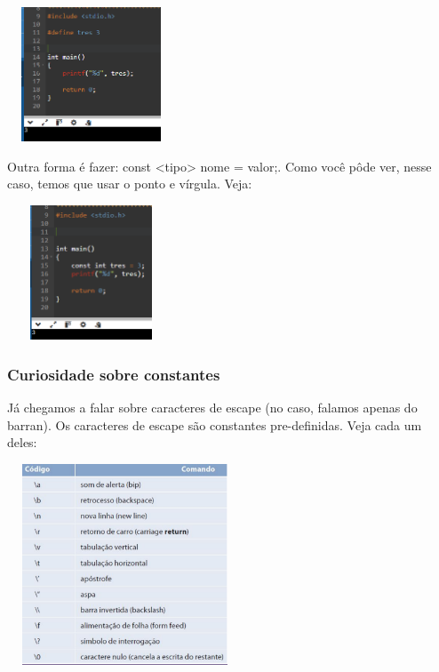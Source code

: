 \documentclass{report}
\begin{document}
	\begin{center}
		
		\includegraphics[width=5cm,height=4cm,keepaspectratio=false]{imagens/define.png}
	\end{center}
	
	Outra forma é fazer: const <tipo> nome = valor;. Como você pôde ver, nesse caso, temos que usar o ponto e vírgula. Veja:
	
	\begin{center}
	
	\includegraphics[width=5cm,height=4cm,keepaspectratio=false]{imagens/const.png}
	\end{center}	
	
	\subsubsection{Curiosidade sobre constantes}
	Já chegamos a falar sobre caracteres de escape (no caso, falamos apenas do barran). Os caracteres de escape são constantes pre-definidas. Veja cada um deles:
	
	\begin{center}
		
		\includegraphics[width=7cm,height=6cm,keepaspectratio=false]{imagens/outros_escape.png}
		
	\end{center}
	
\end{document}

